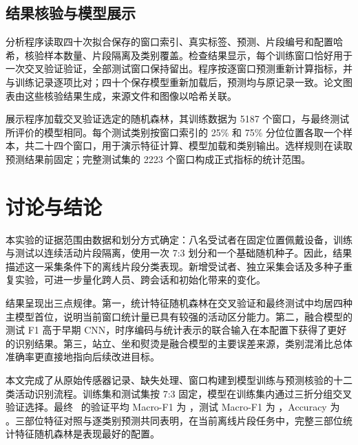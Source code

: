 \documentclass[UTF8,zihao=-4,a4paper,fontset=windows]{ctexart}
\begin{document}
\subsection{结果核验与模型展示}
分析程序读取四十次拟合保存的窗口索引、真实标签、预测、片段编号和配置哈希，核验样本数量、片段隔离及类别覆盖。检查结果显示，每个训练窗口恰好用于一次交叉验证验证，全部测试窗口保持留出。程序按逐窗口预测重新计算指标，并与训练记录逐项比对；四十个保存模型重新加载后，预测均与原记录一致。论文图表由这些核验结果生成，来源文件和图像以哈希关联。

展示程序加载交叉验证选定的随机森林，其训练数据为 5187 个窗口，与最终测试所评价的模型相同。每个测试类别按窗口索引的 25\% 和 75\% 分位位置各取一个样本，共二十四个窗口，用于演示特征计算、模型加载和类别输出。选样规则在读取预测结果前固定；完整测试集的 2223 个窗口构成正式指标的统计范围。

\section{讨论与结论}
本实验的证据范围由数据和划分方式确定：八名受试者在固定位置佩戴设备，训练与测试以连续活动片段隔离，使用一次 7:3 划分和一个基础随机种子。因此，结果描述这一采集条件下的离线片段分类表现。新增受试者、独立采集会话及多种子重复实验，可进一步量化跨人员、跨会话和初始化带来的变化。

结果呈现出三点规律。第一，统计特征随机森林在交叉验证和最终测试中均居四种主模型首位，说明当前窗口统计量已具有较强的活动区分能力。第二，融合模型的测试 F1 高于早期 CNN，时序编码与统计表示的联合输入在本配置下获得了更好的识别结果。第三，站立、坐和熨烫是融合模型的主要误差来源，类别混淆比总体准确率更直接地指向后续改进目标。

本文完成了从原始传感器记录、缺失处理、窗口构建到模型训练与预测核验的十二类活动识别流程。训练集和测试集按 7:3 固定，模型在训练集内通过三折分组交叉验证选择。最终 \BestName\ 的验证平均 Macro-F1 为 \BestCV，测试 Macro-F1 为 \BestFone，Accuracy 为 \BestAccuracy。三部位特征对照与逐类别预测共同表明，在当前离线片段任务中，完整三部位统计特征随机森林是表现最好的配置。
\end{document}
